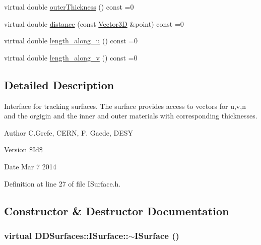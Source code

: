 \begin{DoxyCompactItemize}
virtual double \hyperlink{class_d_d_surfaces_1_1_i_surface_aa2559a8904e474835c5d24c243a44909}{outerThickness} () const =0
\item 
virtual double \hyperlink{class_d_d_surfaces_1_1_i_surface_a430ebd157354388b50218dfb356a9ca1}{distance} (const \hyperlink{class_d_d_surfaces_1_1_vector3_d}{Vector3D} \&point) const =0
\item 
virtual double \hyperlink{class_d_d_surfaces_1_1_i_surface_a0060710912d3447e296a8e0875690cc9}{length\_\-along\_\-u} () const =0
\item 
virtual double \hyperlink{class_d_d_surfaces_1_1_i_surface_a9a4682bfa68557d53cfd319cfa54148d}{length\_\-along\_\-v} () const =0
\end{DoxyCompactItemize}


\subsection{Detailed Description}
Interface for tracking surfaces. The surface provides access to vectors for u,v,n and the orgigin and the inner and outer materials with corresponding thicknesses.

\begin{DoxyAuthor}{Author}
C.Grefe, CERN, F. Gaede, DESY 
\end{DoxyAuthor}
\begin{DoxyVersion}{Version}
\$Id\$ 
\end{DoxyVersion}
\begin{DoxyDate}{Date}
Mar 7 2014 
\end{DoxyDate}


Definition at line 27 of file ISurface.h.

\subsection{Constructor \& Destructor Documentation}
\hypertarget{class_d_d_surfaces_1_1_i_surface_a80873dc47fb91dabae0f389de8b32055}{
\subsubsection[{$\sim$ISurface}]{\setlength{\rightskip}{0pt plus 5cm}virtual DDSurfaces::ISurface::$\sim$ISurface ()}}
\label{class_d_d_surfaces_1_1_i_surface_a80873dc47fb91dabae0f389de8b32055}


